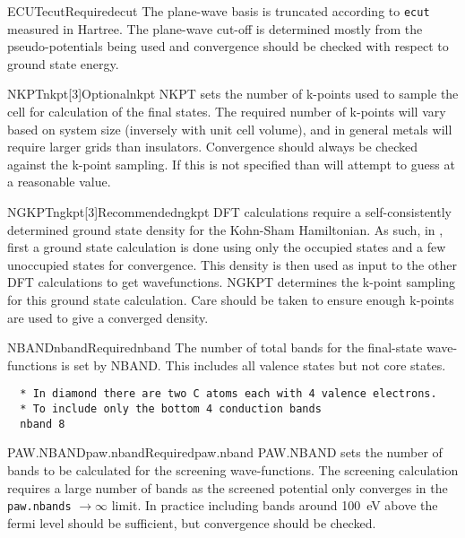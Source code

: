 \documentclass[11pt]{report}
\begin{document}
\begin{Card}{ECUT}{ecut}{Required}{ecut}
The plane-wave basis is truncated according to \texttt{ecut} measured in Hartree. The plane-wave cut-off is determined mostly from the pseudo-potentials being used and convergence should be checked with respect to ground state energy.
\end{Card}

\begin{Card}{NKPT}{nkpt[3]}{Optional}{nkpt}
NKPT sets the number of k-points used to sample the cell for calculation of the final states. The required number of k-points will vary based on system size (inversely with unit cell volume), and in general metals will require larger grids than insulators. Convergence should always be checked against the k-point sampling. If this is not specified than  will attempt to guess at a reasonable value. 
\end{Card}

\begin{Card}{NGKPT}{ngkpt[3]}{Recommended}{ngkpt}
DFT calculations require a self-consistently determined ground state density for the Kohn-Sham Hamiltonian. As such, in , first a ground state calculation is done using only the occupied states and a few unoccupied states for convergence. This density is then used as input to the other DFT calculations to get wavefunctions. NGKPT determines the k-point sampling for this ground state calculation. Care should be taken to ensure enough k-points are used to give a converged density.
\end{Card}

\begin{Card}{NBAND}{nband}{Required}{nband}
The number of total bands for the final-state wave-functions is set by NBAND. This includes all valence states but not core states.
\begin{verbatim}
  * In diamond there are two C atoms each with 4 valence electrons.
  * To include only the bottom 4 conduction bands
  nband 8
\end{verbatim}
\end{Card}

\begin{Card}{PAW.NBAND}{paw.nband}{Required}{paw.nband}
PAW.NBAND sets the number of bands to be calculated for the screening wave-functions. The screening calculation requires a large number of bands as the screened potential only converges in the \texttt{paw.nbands} $\rightarrow \infty$ limit. In practice including bands around 100~eV above the fermi level should be sufficient, but convergence should be checked. 
\end{Card}
\end{document}
